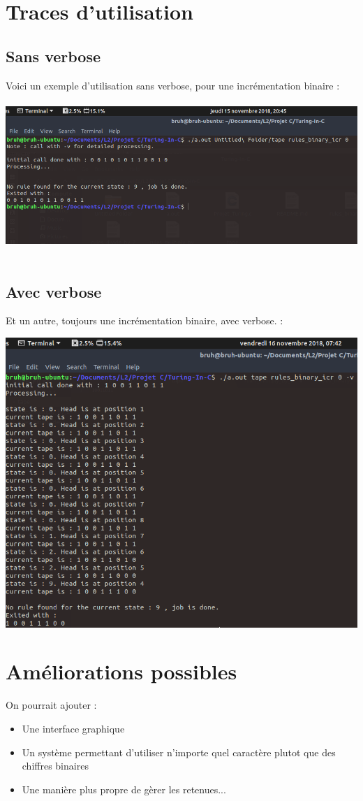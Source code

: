 \documentclass[12pt,a4paper]{report}
\begin{document}
\section{Traces d'utilisation}
\subsection{Sans verbose}
Voici un exemple d'utilisation sans verbose, pour une incrémentation binaire :\\ \\
\includegraphics[scale=2.0]{screen1.png}
\\ \\
\subsection{Avec verbose}
Et un autre, toujours une incrémentation binaire, avec verbose. :

\includegraphics[scale=1.9]{screen2.png}

\section{Améliorations possibles}
On pourrait ajouter : 
\begin{itemize}
\item Une interface graphique
\item Un système permettant d'utiliser n'importe quel caractère plutot que des chiffres binaires
\item Une manière plus propre de gèrer les retenues...
\end{itemize}
\end{document}
